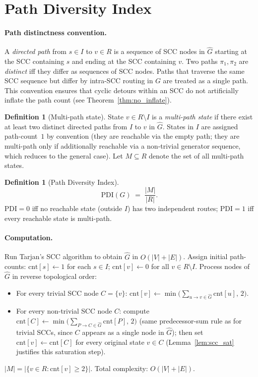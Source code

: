 \documentclass[11pt,letterpaper]{article}
\theoremstyle{plain}
\theoremstyle{definition}
\newtheorem{definition}[theorem]{Definition}
\theoremstyle{remark}
\newcommand{\PDI}{\mathrm{PDI}}
\newcommand{\Ghat}{\hat{G}}
\begin{document}
\section{Path Diversity Index}
\label{sec:definition}

\paragraph{Path distinctness convention.}
A \emph{directed path} from $s \in I$ to $v \in R$ is a sequence of SCC
nodes in $\Ghat$ starting at the SCC containing $s$ and ending at the
SCC containing $v$.
Two paths $\pi_1, \pi_2$ are \emph{distinct} iff they differ as
sequences of SCC nodes.
Paths that traverse the same SCC sequence but differ by intra-SCC routing
in $G$ are treated as a single path.
This convention ensures that cyclic detours within an SCC do not
artificially inflate the path count (see Theorem~\ref{thm:no_inflate}).

\begin{definition}[Multi-path state]
\label{def:mps}
  State $v \in R \setminus I$ is a \emph{multi-path state} if there
  exist at least two distinct directed paths from $I$ to $v$ in $\Ghat$.
  States in $I$ are assigned path-count~$1$ by convention (they are
  reachable via the empty path; they are multi-path only if
  additionally reachable via a non-trivial generator sequence,
  which reduces to the general case).
  Let $M \subseteq R$ denote the set of all multi-path states.
\end{definition}

\begin{definition}[Path Diversity Index]
\label{def:pdi}
  \[
    \PDI(G) \;=\; \frac{|M|}{|R|}.
  \]
  $\PDI = 0$ iff no reachable state (outside $I$) has two independent routes;
  $\PDI = 1$ iff every reachable state is multi-path.
\end{definition}

\paragraph{Computation.}
Run Tarjan's SCC algorithm to obtain $\Ghat$ in $O(|V|+|E|)$.
Assign initial path-counts: $\mathrm{cnt}[s] \leftarrow 1$ for each $s \in I$;
$\mathrm{cnt}[v] \leftarrow 0$ for all $v \in R \setminus I$.
Process nodes of $\Ghat$ in reverse topological order:
\begin{itemize}
  \item For every trivial SCC node $C = \{v\}$:
    $\mathrm{cnt}[v] \leftarrow \min\bigl(\sum_{u \to v \in \Ghat} \mathrm{cnt}[u],\, 2\bigr)$.
  \item For every non-trivial SCC node $C$: compute
    $\mathrm{cnt}[C] \leftarrow
      \min\!\bigl(\sum_{P \to C \in \Ghat} \mathrm{cnt}[P],\,2\bigr)$
    (same predecessor-sum rule as for trivial SCCs, since $C$ appears as
    a single node in $\Ghat$); then set $\mathrm{cnt}[v] \leftarrow
    \mathrm{cnt}[C]$ for every original state $v \in C$
    (Lemma~\ref{lem:scc_sat} justifies this saturation step).
\end{itemize}
$|M| = |\{v \in R : \mathrm{cnt}[v] \geq 2\}|$.
Total complexity: $O(|V|+|E|)$.
\end{document}
